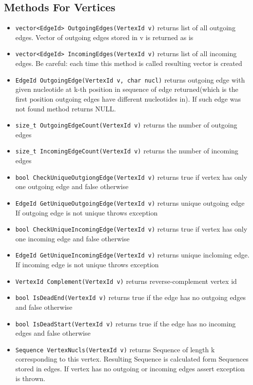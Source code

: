 \documentclass[a4paper,10pt]{article}
\begin{document}
\subsection*{Methods For Vertices}
\begin{itemize}
\item \texttt{vector<EdgeId> OutgoingEdges(VertexId v)} returns list of all outgoing edges. Vector of outgoing edges stored 
in v is returned as is
\item \texttt{vector<EdgeId> IncomingEdges(VertexId v)} returns list of all incoming edges. Be careful: each time this method 
is called resulting vector is created
\item \texttt{EdgeId OutgoingEdge(VertexId v, char nucl)} returns outgoing edge with given nucleotide at k-th position in sequence of
edge returned(which is the first position outgoing edges have different nucleotides in).
If such edge was not found method returns NULL.
\item \texttt{size\_t OutgoingEdgeCount(VertexId v)} returns the number of outgoing edges
\item \texttt{size\_t IncomingEdgeCount(VertexId v)} returns the number of incoming edges

\item \texttt{bool CheckUniqueOutgiongEdge(VertexId v)} returns true if vertex has only one outgoing edge and false otherwise
\item \texttt{EdgeId GetUniqueOutgoingEdge(VertexId v)} returns unique outgoing edge
If outgoing edge is not unique throws exception
\item \texttt{bool CheckUniqueIncomingEdge(VertexId v)} returns true if vertex has only one incoming edge and false otherwise
\item \texttt{EdgeId GetUniqueIncomingEdge(VertexId v)} returns unique incloming edge. 
If incoming edge is not unique throws exception
\item \texttt{VertexId Complement(VertexId v)} returns reverse-complement vertex id
\item \texttt{bool IsDeadEnd(VertexId v)} returns true if the edge has no outgoing edges and false otherwise
\item \texttt{bool IsDeadStart(VertexId v)} returns true if the edge has no incoming edges and false otherwise 
\item \texttt{Sequence VertexNucls(VertexId v)} returns Sequence of length k corresponding to this vertex. Resulting
Sequence is calculated form Sequences stored in edges. If vertex has no outgoing or incoming edges assert exception is
thrown.
\end{itemize}
\end{document}

